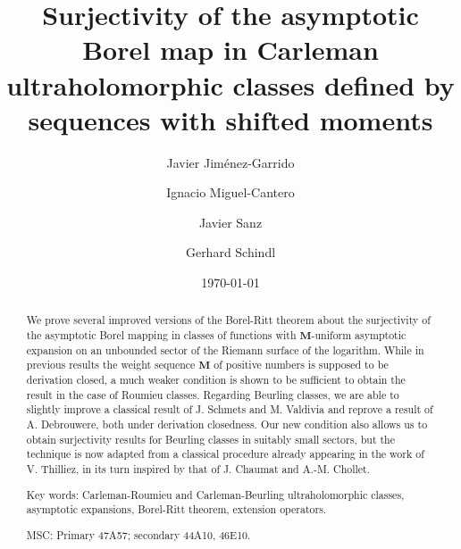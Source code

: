\documentclass[11pt,a4paper]{article}
\theoremstyle{plain}
\theoremstyle{definition}
\numberwithin{equation}{section}
\newcommand{\M}{{\boldsymbol{M}}}
\begin{document}
\title{Surjectivity of the asymptotic Borel map in Carleman ultraholomorphic classes defined by sequences with shifted moments}
\author{Javier Jim\'enez-Garrido \and Ignacio Miguel-Cantero \and Javier Sanz \and Gerhard Schindl}
\date{\today}

\maketitle

\begin{abstract}
We prove several improved versions of the Borel-Ritt theorem about the surjectivity of the asymptotic Borel mapping in classes of functions with $\M$-uniform asymptotic expansion on an unbounded sector of the Riemann surface of the logarithm. While in previous results the weight sequence $\M$ of positive numbers is supposed to be derivation closed, a much weaker condition is shown to be sufficient to obtain the result in the case of Roumieu classes. Regarding Beurling classes, we are able to slightly improve a classical result of J. Schmets and M. Valdivia and reprove a result of A. Debrouwere, both under derivation closedness. Our new condition also allows us to obtain surjectivity results for Beurling classes in suitably small sectors, but the technique is now adapted from a classical procedure already appearing in the work of V. Thilliez, in its turn inspired by that of J. Chaumat and A.-M. Chollet.
\par\medskip

\noindent Key words: Carleman-Roumieu and Carleman-Beurling ultraholomorphic classes, asymptotic expansions, Borel-Ritt theorem, extension operators.
\par
\medskip
{} MSC: Primary 47A57; secondary 44A10, 46E10. \end{abstract}
\end{document}
